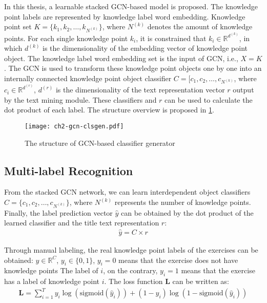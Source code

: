 In this thesis, a learnable stacked GCN-based model is proposed. The knowledge point labels are represented by knowledge label word embedding. Knowledge point set \(K=\{k_1,k_2,\ldots,k_{N^{(k)}}\} \), where \(N^{(k)}\) denotes the amount of knowledge points. For each single knowledge point \(k_i\), it is constrained that \(k_i \in \mathbb{R}^ {d^{(k)}}\), in which \(d^{(k)}\) is the dimensionality of the embedding vector of knowledge point object. The knowledge label word embedding set is the input of GCN, i.e., \(X = K\). The GCN is used to transform these knowledge point objects one by one into an internally connected knowledge point object classifier \(C=[c_1,c_2,\ldots,c_{N^{(k)}}\), where \(c_i \in \mathbb {R}^{d^{(r)}}\), \(d^{(r)}\) is the dimensionality of the text representation vector \(r\) output by the text mining module. These classifiers and \(r\) can be used to calculate the dot product of each label. The structure overview is proposed in \figurename{\ref{fig:ch2-gcn-clsgen}}.

\begin{figure}[H]
	\centering
	\texttt{[image: ch2-gcn-clsgen.pdf]}
	\caption{The structure of GCN-based classifier generator}\label{fig:ch2-gcn-clsgen}
\end{figure}

\subsection{Multi-label Recognition}

From the stacked GCN network, we can learn interdependent object classifiers \(C=\{c_1,c_2,\ldots,c_{N^{(k)}}\} \), where \(N^{(k)}\) represents the number of knowledge points. Finally, the label prediction vector \(\hat{y}\) can be obtained by the dot product of the learned classifier and the title text representation \(r\):
\begin{align}
	\hat{y} = C\times r
\end{align}

Through manual labeling, the real knowledge point labels of the exercises can be obtained: \(y\in \mathbb{R}^C\), \(y_i\in \{0,1\} \), \(y_i=0\) means that the exercise does not have knowledge points The label of \(i\), on the contrary, \(y_i=1\) means that the exercise has a label of knowledge point \(i\). The loss function \(\mathbf{L}\) can be written as:
\begin{align}
	\mathbf{L}=\sum_{i=1}^{T} y_i \log (\text{sigmoid}(\hat{y}_i))+(1-y_i) \log (1-\text{sigmoid}(\hat{y}_i))
\end{align}

